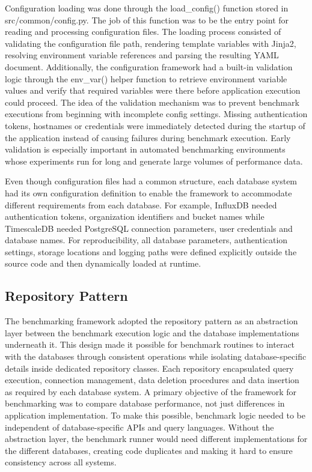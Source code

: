 Configuration loading was done through the load\_config() function stored in src/common/config.py. The job of this function was to be the entry point for reading and processing configuration files. The loading process consisted of validating the configuration file path, rendering template variables with Jinja2, resolving environment variable references and parsing the resulting YAML document. Additionally, the configuration framework had a built-in validation logic through the env\_var() helper function to retrieve environment variable values and verify that required variables were there before application execution could proceed. The idea of the validation mechanism was to prevent benchmark executions from beginning with incomplete config settings. Missing authentication tokens, hostnames or credentials were immediately detected during the startup of the application instead of causing failures during benchmark execution. Early validation is especially important in automated benchmarking environments whose experiments run for long and generate large volumes of performance data. 

Even though configuration files had a common structure, each database system had its own configuration definition to enable the framework to accommodate different requirements from each database. For example, InfluxDB needed authentication tokens, organization identifiers and bucket names while TimescaleDB needed PostgreSQL connection parameters, user credentials and database names. For reproducibility, all database parameters, authentication settings, storage locations and logging paths were defined explicitly outside the source code and then dynamically loaded at runtime.

\subsection{Repository Pattern}
The benchmarking framework adopted the repository pattern as an abstraction layer between the benchmark execution logic and the database implementations underneath it. This design made it possible for benchmark routines to interact with the databases through consistent operations while isolating database-specific details inside dedicated repository classes. Each repository encapsulated query execution, connection management, data deletion procedures and data insertion as required by each database system. A primary objective of the framework for benchmarking was to compare database performance, not just differences in application implementation. To make this possible, benchmark logic needed to be independent of database-specific APIs and query languages. Without the abstraction layer, the benchmark runner would need different implementations for the different databases, creating code duplicates and making it hard to ensure consistency across all systems. 

